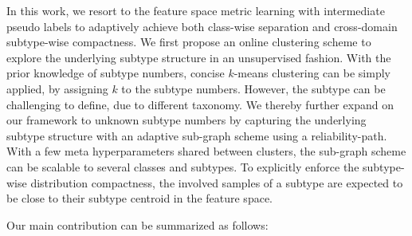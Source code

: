  
 
 
 



In this work, we resort to the feature space metric learning with intermediate pseudo labels to adaptively achieve both class-wise separation and cross-domain subtype-wise compactness. We first propose an online clustering scheme to explore the underlying subtype structure in an unsupervised fashion. With the prior knowledge of subtype numbers, concise $k$-means clustering can be simply applied, by assigning $k$ to the subtype numbers. However, the subtype can be challenging to define, due to different taxonomy. We thereby further expand on our framework to unknown subtype numbers by capturing the underlying subtype structure with an adaptive sub-graph scheme using a reliability-path. With a few meta hyperparameters shared between clusters, the sub-graph scheme can be scalable to several classes and subtypes. To explicitly enforce the subtype-wise distribution compactness, the involved samples of a subtype are expected to be close to their subtype centroid in the feature space. 




 

 
 

Our main contribution can be summarized as follows:

